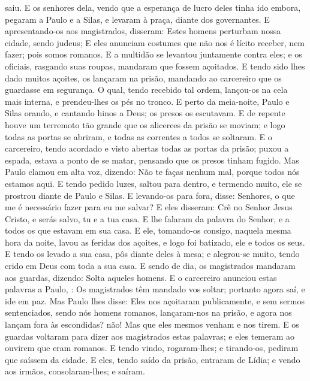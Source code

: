 {{} saiu.
  E os senhores dela, vendo que a esperança de lucro deles tinha ido embora, pegaram a Paulo e a Silas, e
{} levaram à praça, diante dos governantes.
  E apresentando-os aos magistrados, disseram: Estes homens perturbam nossa cidade, sendo judeus;
  E eles anunciam costumes que não nos é lícito receber, nem fazer; pois somos romanos.
  E a multidão se levantou juntamente contra eles; e os oficiais, rasgando suas roupas, mandaram que fossem açoitados.
  E tendo sido lhes dado muitos açoites, os lançaram na prisão, mandando ao carcereiro que os guardasse em segurança.
  O qual, tendo recebido tal ordem, lançou-os na cela mais interna, e prendeu-lhes os pés no tronco.
  E perto da meia-noite, Paulo e Silas
{} orando, e cantando hinos a Deus;
{} os
{} presos os escutavam.
  E de repente houve um terremoto tão grande que os alicerces da prisão se moviam; e logo todas as portas se abriram, e todas as correntes
{} a todos se soltaram.
  E o carcereiro, tendo acordado e visto abertas todas as portas da prisão; puxou a espada,
{} estava a ponto de se matar, pensando que os presos tinham fugido.
  Mas Paulo clamou em alta voz, dizendo: Não te faças nenhum mal, porque todos nós estamos aqui.
  E tendo pedido luzes, saltou para dentro, e termendo muito, ele se prostrou diante de Paulo e Silas.
  E levando-os para fora, disse: Senhores, o que me é necessário fazer para eu me salvar?
  E eles
{} disseram: Crê no Senhor Jesus Cristo, e serás salvo, tu e a tua casa.
  E lhe falaram da palavra do Senhor, e a todos os que estavam em sua casa.
  E ele, tomando-os consigo, naquela mesma hora da noite, lavou
{} as feridas dos açoites, e logo foi batizado, ele e todos os seus.
  E tendo os levado a sua casa, pôs
{} diante deles à mesa; e alegrou-se muito, tendo crido em Deus com toda a sua casa.
  E sendo
{} de dia, os magistrados mandaram aos guardas, dizendo: Solta aqueles homens.
  E o carcereiro anunciou estas palavras a Paulo,
{} : Os magistrados têm mandado vos soltar; portanto agora saí, e ide em paz.
  Mas Paulo lhes disse: Eles nos açoitaram publicamente, e sem sermos sentenciados, sendo nós homens romanos, lançaram-nos na prisão, e agora nos lançam fora às escondidas?
{} não! Mas que eles mesmos venham e nos tirem.
  E os guardas voltaram para dizer aos magistrados estas palavras; e eles temeram ao ouvirem que eram romanos.
  E tendo vindo, rogaram-lhes; e tirando-os, pediram
{} que saíssem da cidade.
  E eles, tendo saído da prisão, entraram
{} de Lídia; e vendo aos irmãos, consolaram-lhes; e saíram.
\par }

